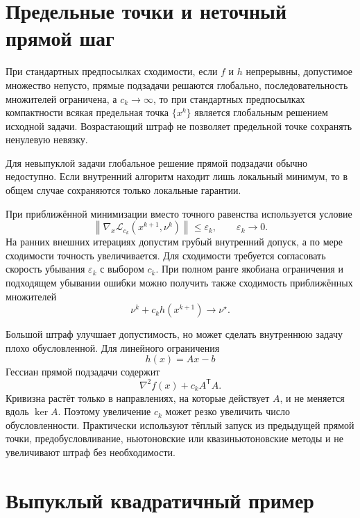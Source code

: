 \section{Предельные точки и неточный прямой шаг}

При стандартных предпосылках сходимости, если \(f\) и \(h\)
непрерывны, допустимое множество непусто, прямые подзадачи решаются
глобально, последовательность множителей ограничена, а
\(c_k\to\infty\), то при стандартных предпосылках компактности всякая
предельная точка \(\{x^k\}\) является глобальным решением исходной
задачи. Возрастающий штраф не позволяет предельной точке сохранять
ненулевую невязку.

Для невыпуклой задачи глобальное решение прямой подзадачи обычно
недоступно. Если внутренний алгоритм находит лишь локальный минимум,
то в общем случае сохраняются только локальные гарантии.

При приближённой минимизации вместо точного равенства используется
условие
\[
    \left\lVert
        \nabla_x
        \mathcal L_{c_k}(x^{k+1},\nu^k)
    \right\rVert
    \le
    \varepsilon_k,
    \qquad
    \varepsilon_k\to0.
\]
На ранних внешних итерациях допустим грубый внутренний допуск, а по
мере сходимости точность увеличивается. Для сходимости требуется согласовать скорость убывания \(\varepsilon_k\) с выбором \(c_k\). При полном ранге якобиана
ограничения и подходящем убывании ошибки можно получить также
сходимость приближённых множителей
\[
    \nu^k+c_kh(x^{k+1})\to\nu^\star.
\]

Большой штраф улучшает допустимость, но может сделать внутреннюю
задачу плохо обусловленной. Для линейного ограничения
\[
    h(x)=Ax-b
\]
Гессиан прямой подзадачи содержит
\[
    \nabla^2f(x)+c_kA^{\mathsf T}A.
\]
Кривизна растёт только в направлениях, на которые действует \(A\),
и не меняется вдоль \(\ker A\). Поэтому увеличение \(c_k\) может
резко увеличить число обусловленности. Практически используют тёплый
запуск из предыдущей прямой точки, предобусловливание, ньютоновские
или квазиньютоновские методы и не увеличивают штраф без необходимости.

\section{Выпуклый квадратичный пример}

